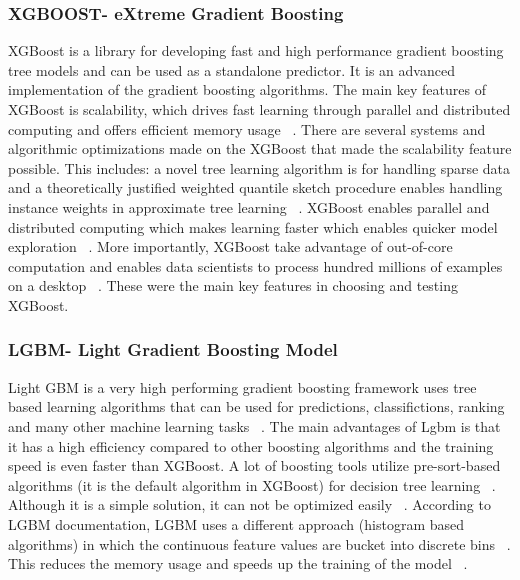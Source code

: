 \documentclass[journal,twoside,web]{ieeecolor}
\begin{document}
\subsubsection{XGBOOST- eXtreme Gradient Boosting}
XGBoost is a library for developing fast and high performance gradient boosting tree models and can be used as a standalone predictor. It is an advanced implementation of the gradient boosting algorithms. The main key features of XGBoost is scalability, which drives fast learning through parallel and distributed computing and offers efficient memory usage ~\cite{kdnuggets_analytics_big_data_data_mining_and_data_science}. There are several systems and algorithmic optimizations made on the XGBoost that made the scalability feature possible. This includes: a novel tree learning algorithm is for handling sparse data and a theoretically justified weighted quantile sketch procedure enables handling instance weights in approximate tree learning ~\cite{kdnuggets_analytics_big_data_data_mining_and_data_science}. XGBoost enables parallel and distributed computing which makes learning faster which enables quicker model exploration ~\cite{kdnuggets_analytics_big_data_data_mining_and_data_science}. More importantly, XGBoost take advantage of out-of-core computation and enables data scientists to process hundred millions of examples on a desktop ~\cite{kdnuggets_analytics_big_data_data_mining_and_data_science}. These were the main key features in choosing and testing XGBoost. 

\subsubsection{LGBM- Light Gradient Boosting Model} 
Light GBM is a very high performing gradient boosting framework uses tree based learning algorithms that can be used for predictions, classifictions, ranking and many other machine learning tasks ~\cite{lightgbm_documentation}. The main advantages of Lgbm is that it has a high efficiency compared to other boosting algorithms and the training speed is even faster than XGBoost. A lot of boosting tools utilize pre-sort-based algorithms (it is the default algorithm in XGBoost) for decision tree learning ~\cite{mehta1996sliq}. Although it is a simple solution, it can not be optimized easily ~\cite{lightgbm_documentation}. According to LGBM documentation, LGBM uses a different approach (histogram based algorithms) in which the continuous feature values are bucket into discrete bins ~\cite{lightgbm_documentation}. This reduces the memory usage and speeds up the training of the model ~\cite{lightgbm_documentation}. 
\end{document}
